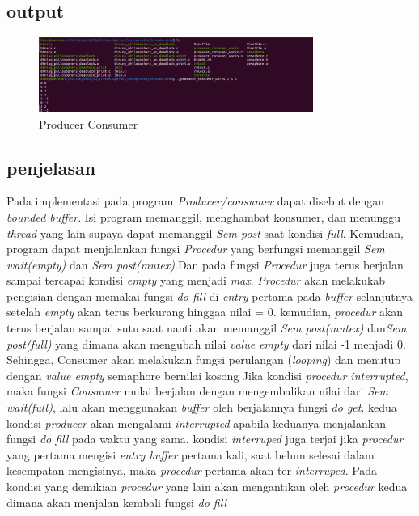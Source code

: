 \documentclass[11pt,a4paper]{article}
\begin{document}
\subsection*{output}
\begin{figure}[h]
	\centering
	\includegraphics[width=0.8\textwidth]{Figure/testing/PercobaanProducer.png}
	\caption{Producer Consumer}
\end{figure}
\vspace{1cm}
\subsection{penjelasan}
Pada implementasi pada program \textit{Producer/consumer} dapat disebut dengan \textit{bounded buffer}. Isi program memanggil, menghambat konsumer, dan menunggu \textit{thread} yang lain supaya dapat memanggil \textit{Sem post} saat kondisi \textit{full}. Kemudian, program dapat menjalankan fungsi \textit{Procedur} yang berfungsi memanggil \textit{Sem wait(empty)} dan \textit{Sem post(mutex)}.Dan pada fungsi \textit{Procedur} juga terus berjalan sampai tercapai kondisi \textit{empty} yang menjadi \textit{max}. \textit{Procedur} akan melakukab pengisian dengan memakai fungsi \textit{do fill} di \textit{entry} pertama pada \textit{buffer} selanjutnya setelah \textit{empty} akan terus berkurang hinggaa nilai = 0. kemudian, \textit{procedur} akan terus berjalan sampai sutu saat nanti akan memanggil \textit{Sem post(mutex)} dan\textit{Sem post(full)} yang dimana akan mengubah nilai \textit{value empty} dari nilai -1 menjadi 0. Sehingga, Consumer akan melakukan fungsi perulangan (\textit{looping}) dan menutup dengan \textit{value empty} semaphore bernilai kosong  
    Jika kondisi \textit{procedur interrupted}, maka fungsi \textit{Consumer}
mulai berjalan dengan mengembalikan nilai dari \textit{Sem wait(full)}, lalu akan menggunakan \textit{buffer} oleh berjalannya fungsi \textit{do get}. kedua kondisi \textit{producer} akan mengalami \textit{interrupted} apabila keduanya menjalankan fungsi \textit{do fill} pada waktu yang sama. kondisi \textit{interruped} juga terjai jika \textit{procedur}  yang pertama mengisi \textit{entry buffer} pertama kali, saat belum selesai dalam kesempatan mengisinya, maka \textit{procedur} pertama akan ter-\textit{interruped}. Pada kondisi yang demikian \textit{procedur} yang lain akan mengantikan oleh \textit{procedur} kedua dimana akan menjalan kembali fungsi \textit{do fill}
\end{document}
